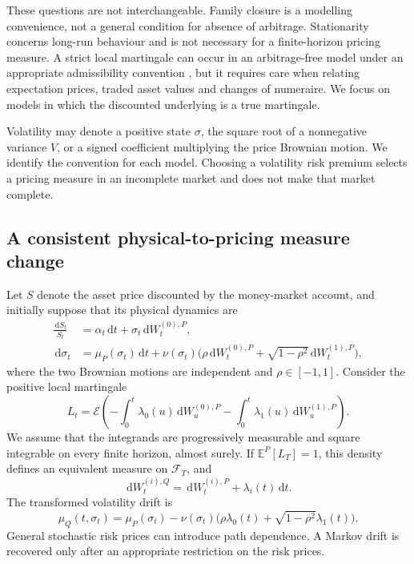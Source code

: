 \documentclass[11pt,a4paper]{article}
\theoremstyle{definition}
\theoremstyle{remark}
\newcommand{\E}{\mathbb{E}}
\newcommand{\dd}{\,\mathrm{d}}
\begin{document}
These questions are not interchangeable. Family closure is a modelling convenience, not a general condition for absence of arbitrage. Stationarity concerns long-run behaviour and is not necessary for a finite-horizon pricing measure. A strict local martingale can occur in an arbitrage-free model under an appropriate admissibility convention \citep{CoxHobson2005}, but it requires care when relating expectation prices, traded asset values and changes of numeraire. We focus on models in which the discounted underlying is a true martingale.

Volatility may denote a positive state \(\sigma\), the square root of a nonnegative variance \(V\), or a signed coefficient multiplying the price Brownian motion. We identify the convention for each model. Choosing a volatility risk premium selects a pricing measure in an incomplete market and does not make that market complete.

\subsection{A consistent physical-to-pricing measure change}

Let \(S\) denote the asset price discounted by the money-market account, and initially suppose that its physical dynamics are
\begin{align}
 \frac{\dd S_t}{S_t}&=\alpha_t\dd t+\sigma_t\dd W_t^{(0),P},\label{eq:physical-price}\\
 \dd\sigma_t&=\mu_P(\sigma_t)\dd t+
 \nu(\sigma_t)\bigl(\rho\dd W_t^{(0),P}
       +\sqrt{1-\rho^2}\dd W_t^{(1),P}\bigr),\label{eq:physical-vol}
\end{align}
where the two Brownian motions are independent and \(\rho\in[-1,1]\).
Consider the positive local martingale
\begin{equation}
 L_t=\mathcal E\left(
 -\int_0^t\lambda_0(u)\dd W_u^{(0),P}
 -\int_0^t\lambda_1(u)\dd W_u^{(1),P}\right).
 \label{eq:density}
\end{equation}
We assume that the integrands are progressively measurable and square integrable on every finite horizon, almost surely. If \(\E^P[L_T]=1\), this density defines an equivalent measure on \(\mathcal F_T\), and
\[
 \dd W_t^{(i),Q}=\dd W_t^{(i),P}+\lambda_i(t)\dd t.
\]
The transformed volatility drift is
\begin{equation}
 \mu_Q(t,\sigma_t)=\mu_P(\sigma_t)-
 \nu(\sigma_t)\bigl(\rho\lambda_0(t)+\sqrt{1-\rho^2}\lambda_1(t)\bigr).
 \label{eq:generic-drift-change}
\end{equation}
General stochastic risk prices can introduce path dependence. A Markov drift is recovered only after an appropriate restriction on the risk prices.
\end{document}
